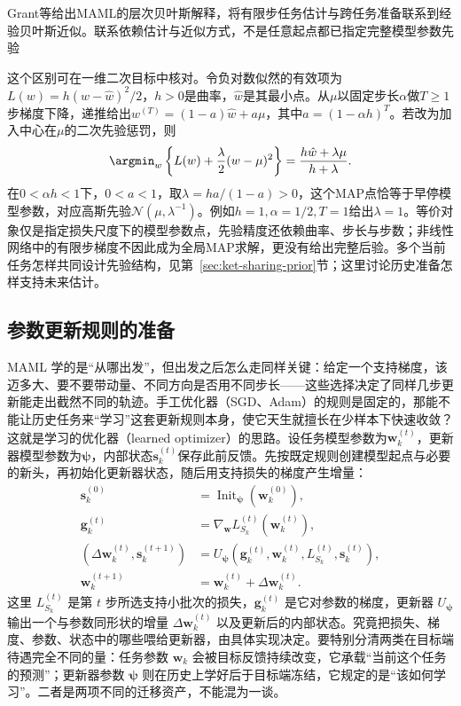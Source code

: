 Grant等给出MAML的层次贝叶斯解释，将有限步任务估计与跨任务准备联系到经验贝叶斯近似。联系依赖估计与近似方式，不是任意起点都已指定完整模型参数先验

这个区别可在一维二次目标中核对。令负对数似然的有效项为$L(w)=h(w-\hat w)^2/2$，$h>0$是曲率，$\hat w$是其最小点。从$\mu$以固定步长$\alpha$做$T\ge1$步梯度下降，递推给出$w^{(T)}=(1-a)\hat w+a\mu$，其中$a=(1-\alpha h)^T$。若改为加入中心在$\mu$的二次先验惩罚，则
\[
  \argmin_w\left\{L(w)+\frac{\lambda}{2}(w-\mu)^2\right\}
    =\frac{h\hat w+\lambda\mu}{h+\lambda}.
\]
在$0<\alpha h<1$下，$0<a<1$，取$\lambda=ha/(1-a)>0$，这个MAP点恰等于早停模型参数，对应高斯先验$\mathcal N(\mu,\lambda^{-1})$。例如$h=1,\alpha=1/2,T=1$给出$\lambda=1$。等价对象仅是指定损失尺度下的模型参数点，先验精度还依赖曲率、步长与步数；非线性网络中的有限步梯度不因此成为全局MAP求解，更没有给出完整后验。多个当前任务怎样共同设计先验结构，见第~\ref{sec:ket-sharing-prior}节；这里讨论历史准备怎样支持未来估计。

\subsection{参数更新规则的准备}
\label{sec:ket-transfer-learned-optimizer}

MAML 学的是“从哪出发”，但出发之后怎么走同样关键：给定一个支持梯度，该迈多大、要不要带动量、不同方向是否用不同步长——这些选择决定了同样几步更新能走出截然不同的轨迹。手工优化器（SGD、Adam）的规则是固定的，那能不能让历史任务来“学习”这套更新规则本身，使它天生就擅长在少样本下快速收敛？这就是学习的优化器（learned optimizer）的思路。设任务模型参数为$\bm w_k^{(t)}$，更新器模型参数为$\bm\psi$，内部状态$\bm s_k^{(t)}$保存此前反馈。先按既定规则创建模型起点与必要的新头，再初始化更新器状态，随后用支持损失的梯度产生增量：
\begin{align}
  \bm s_k^{(0)}
    &=\operatorname{Init}_{\bm\psi}(\bm w_k^{(0)}), \nonumber\\
  \bm g_k^{(t)}
    &=\nabla_{\bm w}L_{S_k}^{(t)}(\bm w_k^{(t)}), \nonumber\\
  (\Delta\bm w_k^{(t)},\bm s_k^{(t+1)})
    &=U_{\bm\psi}(\bm g_k^{(t)},\bm w_k^{(t)},
             L_{S_k}^{(t)},\bm s_k^{(t)}), \nonumber\\
  \bm w_k^{(t+1)}
    &=\bm w_k^{(t)}+\Delta\bm w_k^{(t)}.
  \label{eq:ket-transfer-learned-update}
\end{align}
这里 $L_{S_k}^{(t)}$ 是第 $t$ 步所选支持小批次的损失，$\bm g_k^{(t)}$ 是它对参数的梯度，更新器 $U_{\bm\psi}$ 输出一个与参数同形状的增量 $\Delta\bm w_k^{(t)}$ 以及更新后的内部状态。究竟把损失、梯度、参数、状态中的哪些喂给更新器，由具体实现决定。要特别分清两类在目标端待遇完全不同的量：任务参数 $\bm w_k$ 会被目标反馈持续改变，它承载“当前这个任务的预测”；更新器参数 $\bm\psi$ 则在历史上学好后于目标端冻结，它规定的是“该如何学习”。二者是两项不同的迁移资产，不能混为一谈。

